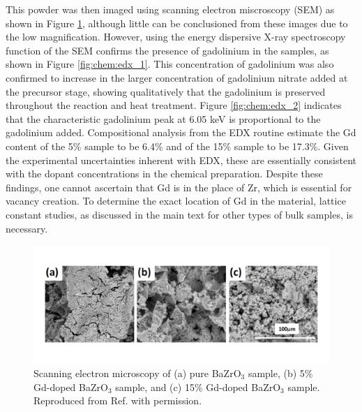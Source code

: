 This powder was then imaged using scanning electron miscroscopy (SEM) as shown in Figure \ref{fig:chem:sem}, although little can be conclusioned from these images due to the low magnification. However, using the energy dispersive X-ray spectroscopy function of the SEM confirms the presence of gadolinium in the samples, as shown in Figure \ref{fig:chem:edx_1}. This concentration of gadolinium was also confirmed to increase in the larger concentration of gadolinium nitrate added at the precursor stage, showing qualitatively that the gadolinium is preserved throughout the reaction and heat treatment. Figure \ref{fig:chem:edx_2} indicates that the characteristic gadolinium peak at 6.05 keV \cite{Kempen2013} is proportional to the gadolinium added. Compositional analysis from the EDX routine estimate the Gd content of the 5\% sample to be 6.4\% and of the 15\% sample to be 17.3\%. Given the experimental uncertainties inherent with EDX, these are essentially consistent with the dopant concentrations in the chemical preparation. Despite these findings, one cannot ascertain that Gd is in the place of Zr, which is essential for vacancy creation. To determine the exact location of Gd in the material, lattice constant studies, as discussed in the main text for other types of bulk samples, is necessary.


\begin{figure}
    \centering
    \includegraphics[scale=.50]{Figures/Chem_SEM.pdf}
    \caption{Scanning electron microscopy of (a) pure BaZrO$_3$ sample, (b) 5\% Gd-doped BaZrO$_3$ sample, and (c) 15\% Gd-doped BaZrO$_3$ sample. Reproduced from Ref. \cite{GCamata2015} with permission.}
    \label{fig:chem:sem}
\end{figure}

